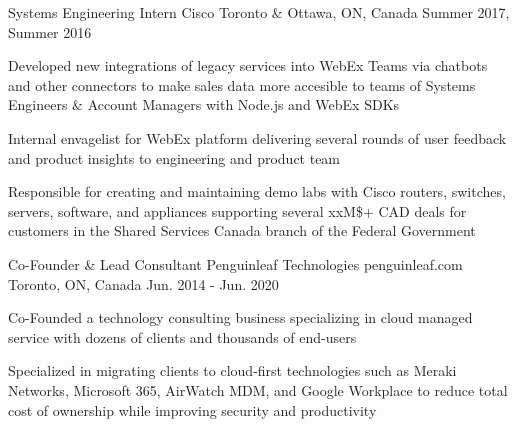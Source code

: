 \begin{cventries}
  \cventry
    {Systems Engineering Intern} %
    {Cisco} %
    {} %
    {Toronto \& Ottawa, ON, Canada} %
    {Summer 2017, Summer 2016} %
    {
      \begin{cvitems} %
        \item {Developed new integrations of legacy services into WebEx Teams via chatbots and other connectors to make sales data more accesible to teams of Systems Engineers \& Account Managers with Node.js and WebEx SDKs}
        \item {Internal envagelist for WebEx platform delivering several rounds of user feedback and product insights to engineering and product team}
        \item {Responsible for creating and maintaining demo labs with Cisco routers, switches, servers, software, and appliances supporting several xxM\$+ CAD deals for customers in the Shared Services Canada branch of the Federal Government}
      \end{cvitems}
    }

  \cventry
    {Co-Founder \& Lead Consultant} %
    {Penguinleaf Technologies} %
    {penguinleaf.com} %
    {Toronto, ON, Canada} %
    {Jun. 2014 - Jun. 2020} %
    {
      \begin{cvitems} %
        \item {Co-Founded a technology consulting business specializing in cloud managed service with dozens of clients and thousands of end-users}
        \item {Specialized in migrating clients to cloud-first technologies such as Meraki Networks, Microsoft 365, AirWatch MDM, and Google Workplace to reduce total cost of ownership while improving security and productivity}
      \end{cvitems}
    }

\end{cventries}
